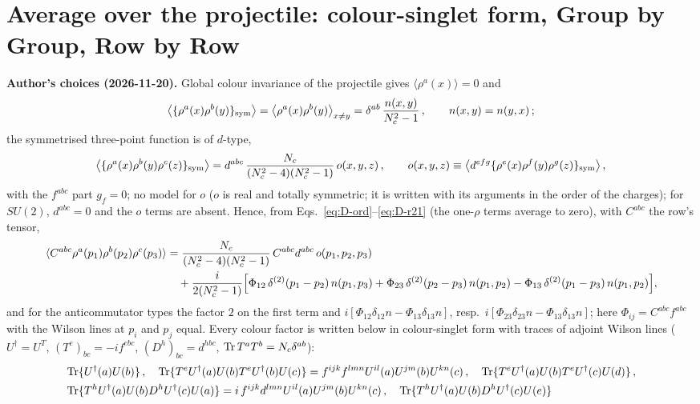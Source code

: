 \section{Average over the projectile: colour-singlet form, Group by Group, Row by Row}\label{sec:E}
\noindent\textbf{Author's choices (2026-11-20).} Global colour invariance of the projectile gives $\langle\rho^{a}(x)\rangle=0$ and
\begin{align}
\big\langle\{\rho^{a}(x)\rho^{b}(y)\}_{\rm sym}\big\rangle=\big\langle\rho^{a}(x)\rho^{b}(y)\big\rangle_{x\neq y}=\delta^{ab}\,\frac{n(x,y)}{N_{c}^{2}-1}\,,\qquad n(x,y)=n(y,x)\,;\notag
\end{align}
the symmetrised three-point function is of $d$-type,
\begin{align}
\big\langle\{\rho^{a}(x)\rho^{b}(y)\rho^{c}(z)\}_{\rm sym}\big\rangle=d^{abc}\,\frac{N_{c}}{(N_{c}^{2}-4)(N_{c}^{2}-1)}\,o(x,y,z)\,,\qquad o(x,y,z)\equiv\big\langle d^{efg}\{\rho^{e}(x)\rho^{f}(y)\rho^{g}(z)\}_{\rm sym}\big\rangle\,,\notag
\end{align}
with the $f^{abc}$ part $g_{f}=0$; no model for $o$ ($o$ is real and totally symmetric; it is written with its arguments in the order of the charges); for $SU(2)$, $d^{abc}=0$ and the $o$ terms are absent. Hence, from Eqs.~\eqref{eq:D-ord}--\eqref{eq:D-r21} (the one-$\rho$ terms average to zero), with $C^{abc}$ the row's tensor,
\begin{align}
\langle C^{abc}\rho^{a}(p_{1})\rho^{b}(p_{2})\rho^{c}(p_{3})\rangle&=\frac{N_{c}}{(N_{c}^{2}-4)(N_{c}^{2}-1)}\,C^{abc}d^{abc}\,o(p_{1},p_{2},p_{3})\notag\\
&\quad+\frac{i}{2(N_{c}^{2}-1)}\Big[\Phi_{12}\,\delta^{(2)}(p_{1}-p_{2})\,n(p_{1},p_{3})+\Phi_{23}\,\delta^{(2)}(p_{2}-p_{3})\,n(p_{1},p_{2})-\Phi_{13}\,\delta^{(2)}(p_{1}-p_{3})\,n(p_{1},p_{2})\Big],\notag
\end{align}
and for the anticommutator types the factor $2$ on the first term and $i[\Phi_{12}\delta_{12}n-\Phi_{13}\delta_{13}n]$, resp.\ $i[\Phi_{23}\delta_{23}n-\Phi_{13}\delta_{13}n]$; here $\Phi_{ij}=C^{abc}f^{abc}$ with the Wilson lines at $p_{i}$ and $p_{j}$ equal. Every colour factor is written below in colour-singlet form with traces of adjoint Wilson lines ($U^{\dagger}=U^{T}$, $(T^{e})_{bc}=-if^{ebc}$, $(D^{h})_{bc}=d^{hbc}$, ${\rm Tr}\,T^{a}T^{b}=N_{c}\delta^{ab}$):
\begin{align}
&{\rm Tr}\{U^{\dagger}(a)U(b)\}\,,\quad{\rm Tr}\{T^{e}U^{\dagger}(a)U(b)T^{e}U^{\dagger}(b)U(c)\}=f^{ijk}f^{lmn}U^{il}(a)U^{jm}(b)U^{kn}(c)\,,\quad{\rm Tr}\{T^{e}U^{\dagger}(a)U(b)T^{e}U^{\dagger}(c)U(d)\}\,,\notag\\
&{\rm Tr}\{T^{h}U^{\dagger}(a)U(b)D^{h}U^{\dagger}(c)U(a)\}=i\,f^{ijk}d^{lmn}U^{il}(a)U^{jm}(b)U^{kn}(c)\,,\quad{\rm Tr}\{T^{h}U^{\dagger}(a)U(b)D^{h}U^{\dagger}(c)U(e)\}\notag
\end{align}
